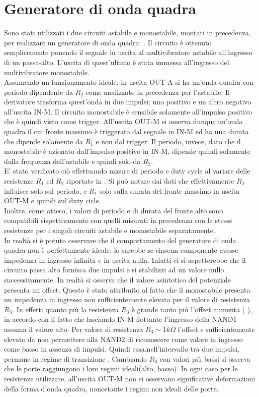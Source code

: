 \section{Generatore di onda quadra}
Sono stati utilizzati i due circuiti astabile e monostabile, montati in precedenza, per realizzare un generatore di onda quadra: . Il circuito è ottenuto semplicemente ponendo il segnale in uscita al multivibratore astabile all'ingresso di un passa-alto. L'uscita di quest'ultimo è stata immessa all'ingresso del multivibratore monostabile. \\
Assumendo un funzionamento ideale, in uscita OUT-A si ha un'onda quadra con periodo dipendente da $R_{2}$ come analizzato in precedenza per l'astabile. Il derivatore trasforma quest'onda in due impulsi: uno positivo e un altro negativo all'uscita IN-M. Il circuito monostabile è sensibile solamente all'impulso positivo che è quindi visto come trigger.
 All'uscita OUT-M si osserva dunque un'onda quadra il cui fronte massimo è triggerato dal segnale in IN-M ed ha una durata che dipende solamente da $R_{1}$ e non dal trigger. Il periodo, invece, dato che il monostabile è azionato dall'impulso positivo in IN-M, dipende quindi solamente dalla frequenza dell'astabile e quindi solo da $R_{2}$.\\
 E' stato verificato ciò effettuando misure di periodo e duty cycle al variare delle resistenze $R_{1}$ ed $R_{2}$ riportate in . Si può notare dai dati che effettivamente $R_{2}$ influisce solo sul periodo, e $R_{1}$ solo sulla durata del fronte massimo in uscita OUT-M e quindi sul duty cicle. \\
 Inoltre, come atteso, i valori di periodo e di durata del fronte alto sono compatibili rispettivamente con quelli misurati in precedenza con le stesse resistenze per i singoli circuiti astabile e monostabile separatamente.\\
 In realtà si è potuto osservare che il comportamento del generatore di onda quadra non è perfettamente ideale: lo sarebbe se ciascun componente avesse impedenza in ingresso infinita e in uscita nulla. Infatti ci si aspetterebbe che il circuito passa alto fornisca due impulsi e si stabilizzi ad un valore nullo successivamente. In realtà si osserva che il valore asintotico del potenziale presenta un offset. Questo è stato attribuito al fatto che il monostabile presenta un impedenza in ingresso non sufficientemente elevata per il valore di resistenza $R_{3}$. In effetti quanto più la resistenza $R_{3}$ è grande tanto più l'offset aumenta ( ), in accordo con il fatto che lasciando IN-M flottante l'ingresso della NAND1 assuma il valore alto. Per valore di resistenza $R_{3} \sim 1 k\Omega$ l'offset e sufficientemente elevato da non permettere alla NAND2 di riconoscere come valore in ingresso come basso in assenza di impulsi. Quindi essa,nell'intervallo tra due impulsi, permane in regime di transizione . Cambiando $R_{3}$ con valori più bassi si osserva che le porte raggiungono i loro regimi ideali(alto, basso). In ogni caso per le resistenze utilizzate, all'uscita OUT-M non si osservano significative deformazioni della forma d'onda quadra, nonostante i regimi non ideali delle porte.\\
